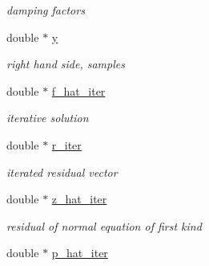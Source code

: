 \begin{CompactItemize}
\begin{CompactList}\small\item\em damping factors \item\end{CompactList}\item 
\hypertarget{structsolver__plan__double_ccc401c5912fe60922d4ce2b30132e18}{
double $\ast$ \hyperlink{structsolver__plan__double_ccc401c5912fe60922d4ce2b30132e18}{y}}
\label{structsolver__plan__double_ccc401c5912fe60922d4ce2b30132e18}

\begin{CompactList}\small\item\em right hand side, samples \item\end{CompactList}\item 
\hypertarget{structsolver__plan__double_25db7056f50bf19ab3e3527050a415d1}{
double $\ast$ \hyperlink{structsolver__plan__double_25db7056f50bf19ab3e3527050a415d1}{f\_\-hat\_\-iter}}
\label{structsolver__plan__double_25db7056f50bf19ab3e3527050a415d1}

\begin{CompactList}\small\item\em iterative solution \item\end{CompactList}\item 
\hypertarget{structsolver__plan__double_088f3b3f683ffc2b9c7e42b02fa17183}{
double $\ast$ \hyperlink{structsolver__plan__double_088f3b3f683ffc2b9c7e42b02fa17183}{r\_\-iter}}
\label{structsolver__plan__double_088f3b3f683ffc2b9c7e42b02fa17183}

\begin{CompactList}\small\item\em iterated residual vector \item\end{CompactList}\item 
\hypertarget{structsolver__plan__double_ac8b0f141a85d329e39319f6c19f3e48}{
double $\ast$ \hyperlink{structsolver__plan__double_ac8b0f141a85d329e39319f6c19f3e48}{z\_\-hat\_\-iter}}
\label{structsolver__plan__double_ac8b0f141a85d329e39319f6c19f3e48}

\begin{CompactList}\small\item\em residual of normal equation of first kind \item\end{CompactList}\item 
\hypertarget{structsolver__plan__double_21913274af8b42c199546919e2999677}{
double $\ast$ \hyperlink{structsolver__plan__double_21913274af8b42c199546919e2999677}{p\_\-hat\_\-iter}}
\label{structsolver__plan__double_21913274af8b42c199546919e2999677}


\end{CompactItemize}
